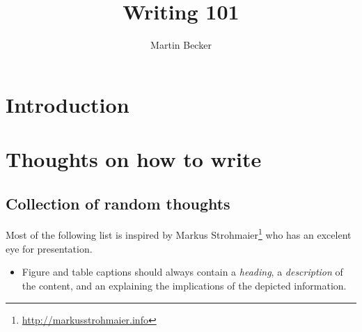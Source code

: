 \documentclass[a4paper]{memoir}
\title{Writing 101}
\author{Martin Becker}
\newcommand{\furl}[1]{\footnote{\url{#1}}}
\begin{document}
\chapter{Introduction}

\chapter{Thoughts on how to write}
\section{Collection of random thoughts}
Most of the following list is inspired by Markus
Strohmaier\furl{http://markusstrohmaier.info} who has an excelent eye
for presentation.
\begin{itemize}
	\item Figure and table captions should always contain a \textit{heading}, 
	a \textit{description} of the content, and an 
	explaining the implications of the depicted information.
\end{itemize} 

\listoftodos 

\end{document}
